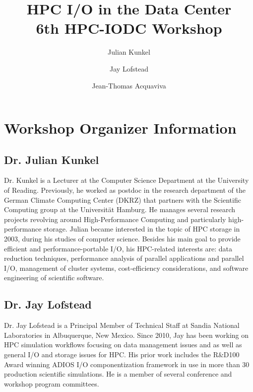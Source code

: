 \documentclass[a4paper,10pt]{article}
\title{HPC I/O in the Data Center\\ {\normalsize 6th HPC-IODC Workshop}}
\author{Julian Kunkel \and Jay Lofstead \and Jean-Thomas Acquaviva}
\begin{document}
\maketitle



\section{Workshop Organizer Information}

\subsection{Dr. Julian Kunkel}

Dr. Kunkel is a Lecturer at the Computer Science Department at the University of Reading. Previously, he worked as postdoc in the research department of the German Climate Computing Center (DKRZ) that partners with the Scientific Computing group at the Universität Hamburg.
He manages several research projects revolving around High-Performance Computing and particularly high-performance storage. Julian became interested in the topic of HPC storage in 2003, during his studies of computer science. Besides his main goal to provide efficient and performance-portable I/O, his HPC-related interests are: data reduction techniques, performance analysis of parallel applications and parallel I/O, management of cluster systems, cost-efficiency considerations, and software engineering of scientific software.

\subsection{Dr. Jay Lofstead}

Dr. Jay Lofstead is a Principal Member of Technical Staff at Sandia National
Laboratories in Albuquerque, New Mexico. Since 2010, Jay has been working on
HPC simulation workflows focusing on data management issues and as well as
general I/O and storage issues for HPC.  His prior work includes the R\&D100
Award winning ADIOS I/O componentization framework in use in more than 30
production scientific simulations. He is a member of several conference and
workshop program committees.
\end{document}
